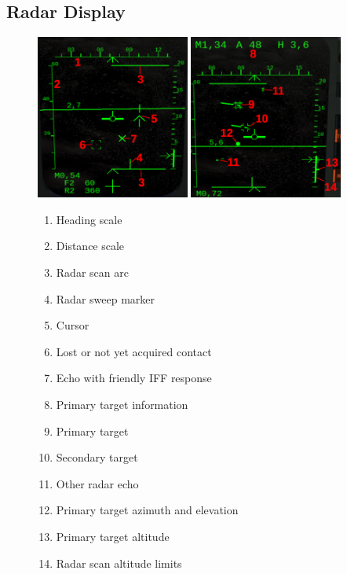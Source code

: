 \subsection{Radar Display}
\begin{figure}[!ht]
  \centering
  \includegraphics[width=0.45\textwidth]{images/displays/MI-radar1.png}
  \includegraphics[width=0.45\textwidth]{images/displays/MI-radar2.png}

  \begin{multicols}{2}
    \begin{enumerate}[nosep]
      \item \label{item:head-scale} Heading scale
      \item \label{item:dist-scale} Distance scale
      \item \label{item:scan-arc} Radar scan arc
      \item \label{item:sweep} Radar sweep marker
      \item \label{item:cursor} Cursor
      \item \label{item:lost-lock} Lost or not yet acquired contact
      \item \label{item:friendly} Echo with friendly IFF response
      \item \label{item:target-info} Primary target information
      \item \label{item:primary} Primary target
      \item \label{item:secondary} Secondary target
      \item \label{item:echo} Other radar echo
      \item \label{item:azi-elev} Primary target azimuth and elevation
      \item \label{item:tgt-alt} Primary target altitude
      \item \label{item:vert-scan-arc} Radar scan altitude limits
    \end{enumerate}
  \end{multicols}


\end{figure}
